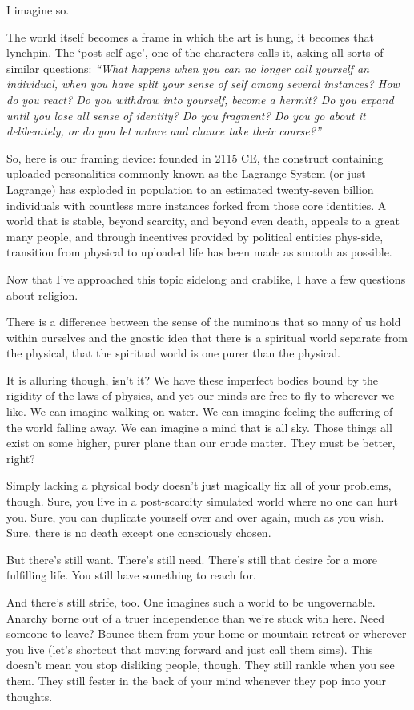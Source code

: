 I imagine so.

The world itself becomes a frame in which the art is hung, it becomes that lynchpin. The `post-self age', one of the characters calls it, asking all sorts of similar questions: \emph{``What happens when you can no longer call yourself an individual, when you have split your sense of self among several instances? How do you react? Do you withdraw into yourself, become a hermit? Do you expand until you lose all sense of identity? Do you fragment? Do you go about it deliberately, or do you let nature and chance take their course?''}

So, here is our framing device: founded in 2115 CE, the construct containing uploaded personalities commonly known as the Lagrange System (or just Lagrange) has exploded in population to an estimated twenty-seven billion individuals with countless more instances forked from those core identities. A world that is stable, beyond scarcity, and beyond even death, appeals to a great many people, and through incentives provided by political entities phys-side, transition from physical to uploaded life has been made as smooth as possible.

Now that I've approached this topic sidelong and crablike, I have a few questions about religion.

There is a difference between the sense of the numinous that so many of us hold within ourselves and the gnostic idea that there is a spiritual world separate from the physical, that the spiritual world is one purer than the physical.

It is alluring though, isn't it? We have these imperfect bodies bound by the rigidity of the laws of physics, and yet our minds are free to fly to wherever we like. We can imagine walking on water. We can imagine feeling the suffering of the world falling away. We can imagine a mind that is all sky. Those things all exist on some higher, purer plane than our crude matter. They must be better, right?

Simply lacking a physical body doesn't just magically fix all of your problems, though. Sure, you live in a post-scarcity simulated world where no one can hurt you. Sure, you can duplicate yourself over and over again, much as you wish. Sure, there is no death except one consciously chosen.

But there's still want. There's still need. There's still that desire for a more fulfilling life. You still have something to reach for.

And there's still strife, too. One imagines such a world to be ungovernable. Anarchy borne out of a truer independence than we're stuck with here. Need someone to leave? Bounce them from your home or mountain retreat or wherever you live (let's shortcut that moving forward and just call them sims). This doesn't mean you stop disliking people, though. They still rankle when you see them. They still fester in the back of your mind whenever they pop into your thoughts.

